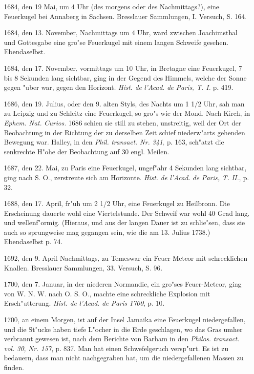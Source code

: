 \documentclass[a4paper, 11pt, oneside, polutonikogreek, german]{article}
\begin{document}
1684, den 19 Mai, um 4 Uhr (des morgens oder des Nachmittags?), eine Feuerkugel bei Annaberg in Sachsen. Bresslauer Sammlungen, I. Versuch, S. 164.

1684, den 13. November, Nachmittags um 4 Uhr, ward zwischen Joachimsthal und Gottesgabe eine gro"se Feuerkugel mit einem langen Schweife gesehen. Ebendaselbst.

1684, den 17. November, vormittags um 10 Uhr, in Bretagne eine Feuerkugel, 7 bis 8 Sekunden lang sichtbar, ging in der Gegend des Himmels, welche der Sonne gegen "uber war, gegen den Horizont. \emph{Hist. de l'Acad. de Paris, T. I.} p. 419.

1686, den 19. Julius, oder den 9. alten Styls, des Nachts um 1 1/2 Uhr, sah man zu Leipzig und zu Schleitz eine Feuerkugel, so gro"s wie der Mond. Nach Kirch, in \emph{Ephem. Nat. Curios.} 1686 schien sie still zu stehen, unstreitig, weil der Ort der Beobachtung in der Richtung der zu derselben Zeit schief niederw"arts gehenden Bewegung war. Halley, in den \emph{Phil. transact. Nr. 341}, p. 163, sch"atzt die senkrechte H"ohe der Beobachtung auf 30 engl. Meilen.

1687, den 22. Mai, zu Paris eine Feuerkugel, ungef"ahr 4 Sekunden lang sichtbar, ging nach S. O., zerstreute sich am Horizonte. \emph{Hist. de l'Acad. de Paris, T. II.}, p. 32.

1688, den 17. April, fr"uh um 2 1/2 Uhr, eine Feuerkugel zu Heilbronn. Die Erscheinung dauerte wohl eine Viertelstunde. Der Schweif war wohl 40 Grad lang, und wellenf"ormig. (Hieraus, und aus der langen Dauer ist zu schlie"sen, dass sie auch so sprungweise mag gegangen sein, wie die am 13. Julius 1738.) Ebendaselbst p. 74.

1692, den 9. April Nachmittags, zu Temeswar ein Feuer-Meteor mit schrecklichen Knallen. Bresslauer Sammlungen, 33. Versuch, S. 96.

1700, den 7. Januar, in der niederen Normandie, ein gro"ses Feuer-Meteor, ging von W. N. W. nach O. S. O., machte eine schreckliche Explosion mit Ersch"utterung. \emph{Hist. de l'Acad. de Paris 1700}, p. 10.

1700, an einem Morgen, ist auf der Insel Jamaika eine Feuerkugel niedergefallen, und die St"ucke haben tiefe L"ocher in die Erde geschlagen, wo das Gras umher verbrannt gewesen ist, nach dem Berichte von Barham in den \emph{Philos. transact. vol. 30, Nr. 157}, p. 837. Man hat einen Schwefelgeruch versp"urt. Es ist zu bedauern, dass man nicht nachgegraben hat, um die niedergefallenen Massen zu finden.
\end{document}
